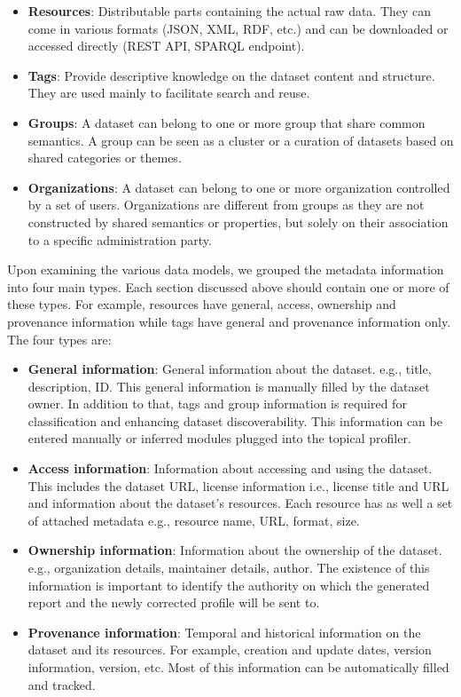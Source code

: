 \documentclass[runningheads,a4paper]{llncs}
\begin{document}
\begin{itemize}
  \item \textbf{Resources}: Distributable parts containing the actual raw data. They can come in various formats (JSON, XML, RDF, etc.) and can be downloaded or accessed directly (REST API, SPARQL endpoint).
  \item \textbf{Tags}: Provide descriptive knowledge on the dataset content and structure. They are used mainly to facilitate search and reuse.
  \item \textbf{Groups}: A dataset can belong to one or more group that share common semantics. A group can be seen as a cluster or a curation of datasets based on shared categories or themes.
  \item \textbf{Organizations}: A dataset can belong to one or more organization controlled by a set of users. Organizations are different from groups as they are not constructed by shared semantics or properties, but solely on their association to a specific administration party.
\end{itemize}

Upon examining the various data models, we grouped the metadata information into four main types. Each section discussed above should contain one or more of these types. For example, resources have general, access, ownership and provenance information while tags have general and provenance information only. The four types are:

\begin{itemize}
\item \textbf{General information}: General information about the dataset. e.g., title, description, ID. This general information is manually filled by the dataset owner. In addition to that, tags and group information is required for classification and enhancing dataset discoverability. This information can be entered manually or inferred modules plugged into the topical profiler.

\item \textbf{Access information}: Information about accessing and using the dataset. This includes the dataset URL, license information i.e., license title and URL and information about the dataset's resources. Each resource has as well a set of attached metadata e.g., resource name, URL, format, size.

\item \textbf{Ownership information}: Information about the ownership of the dataset. e.g., organization details, maintainer details, author. The existence of this information is important to identify the authority on which the generated report and the newly corrected profile will be sent to.

\item \textbf{Provenance information}: Temporal and historical information on the dataset and its resources. For example, creation and update dates, version information, version, etc. Most of this information can be automatically filled and tracked.
\end{itemize}
\end{document}
